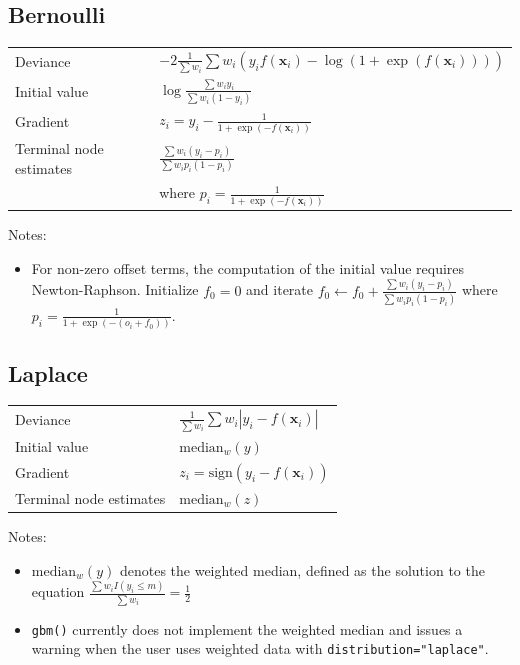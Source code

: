 \documentclass{article}
\begin{document}
\subsection{Bernoulli}

\begin{tabular}{ll}
Deviance & $\displaystyle -2\frac{1}{\sum w_i}
\sum w_i(y_if(\mathbf{x}_i)-\log(1+\exp(f(\mathbf{x}_i))))$ \\
Initial value & $\displaystyle \log\frac{\sum w_iy_i}{\sum w_i(1-y_i)}$ \\
Gradient & $\displaystyle z_i=y_i-\frac{1}{1+\exp(-f(\mathbf{x}_i))}$ \\
Terminal node estimates & $\displaystyle \frac{\sum w_i(y_i-p_i)}{\sum w_ip_i(1-p_i)}$ \\
  & where $\displaystyle p_i = \frac{1}{1+\exp(-f(\mathbf{x}_i))}$ \\
\end{tabular}

Notes:
\begin{itemize}
\item For non-zero offset terms, the computation of the initial value requires Newton-Raphson.
Initialize $f_0=0$ and iterate
$\displaystyle f_0 \leftarrow f_0 + \frac{\sum w_i(y_i-p_i)}{\sum w_ip_i(1-p_i)}$ where
$\displaystyle p_i = \frac{1}{1+\exp(-(o_i+f_0))}$.
\end{itemize}

\subsection{Laplace}

\begin{tabular}{ll}
Deviance & $\frac{1}{\sum w_i} \sum w_i|y_i-f(\mathbf{x}_i)|$ \\
Initial value & $\mbox{median}_w(y)$ \\
Gradient & $z_i=\mbox{sign}(y_i-f(\mathbf{x}_i))$ \\
Terminal node estimates & $\mbox{median}_w(z)$
\end{tabular}

Notes:
\begin{itemize}
\item $\mbox{median}_w(y)$ denotes the weighted median, defined as the solution to the equation $\frac{\sum w_iI(y_i\leq m)}{\sum w_i}=\frac{1}{2}$
\item \texttt{gbm()} currently does not implement the weighted median and issues a warning when the user uses weighted data with \texttt{distribution="laplace"}.
\end{itemize}
\end{document}
